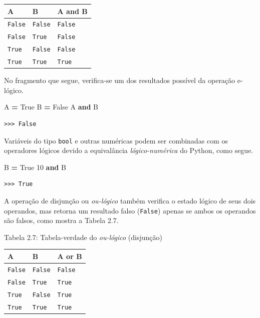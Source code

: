 \documentclass[
]{book}
\newenvironment{Shaded}{\begin{snugshade}}{\end{snugshade}}
\newcommand{\DecValTok}[1]{\textcolor[rgb]{0.00,0.00,0.81}{#1}}
\newcommand{\KeywordTok}[1]{\textcolor[rgb]{0.13,0.29,0.53}{\textbf{#1}}}
\newcommand{\NormalTok}[1]{#1}
\newcommand{\OperatorTok}[1]{\textcolor[rgb]{0.81,0.36,0.00}{\textbf{#1}}}
\newcommand{\VariableTok}[1]{\textcolor[rgb]{0.00,0.00,0.00}{#1}}
\begin{document}
\begin{longtable}[]{@{}lll@{}}
\toprule
A & B & A and B \\
\midrule
\endhead
\texttt{False} & \texttt{False} & \texttt{False} \\
\texttt{False} & \texttt{True} & \texttt{False} \\
\texttt{True} & \texttt{False} & \texttt{False} \\
\texttt{True} & \texttt{True} & \texttt{True} \\
\bottomrule
\end{longtable}

No fragmento que segue, verifica-se um dos resultados possível da operação e-lógico.

\begin{Shaded}
\begin{Highlighting}[]
\NormalTok{A }\OperatorTok{=} \VariableTok{True}
\NormalTok{B }\OperatorTok{=} \VariableTok{False}
\NormalTok{A }\KeywordTok{and}\NormalTok{ B}
\end{Highlighting}
\end{Shaded}

\begin{verbatim}
>>> False
\end{verbatim}

Variáveis do tipo \texttt{bool} e outras numéricas podem ser combinadas com os operadores lógicos devido a equivalância \emph{lógico-numérica} do Python, como segue.

\begin{Shaded}
\begin{Highlighting}[]
\NormalTok{B }\OperatorTok{=} \VariableTok{True}
\DecValTok{10} \KeywordTok{and}\NormalTok{ B}
\end{Highlighting}
\end{Shaded}

\begin{verbatim}
>>> True
\end{verbatim}

A operação de disjunção ou \emph{ou-lógico} também verifica o estado lógico de seus dois operandos, mas retorna um resultado falso (\texttt{False}) apenas se ambos os operandos são falsos, como mostra a Tabela 2.7.

Tabela 2.7: Tabela-verdade do \emph{ou-lógico} (disjunção)

\begin{longtable}[]{@{}lll@{}}
\toprule
A & B & A or B \\
\midrule
\endhead
\texttt{False} & \texttt{False} & \texttt{False} \\
\texttt{False} & \texttt{True} & \texttt{True} \\
\texttt{True} & \texttt{False} & \texttt{True} \\
\texttt{True} & \texttt{True} & \texttt{True} \\
\bottomrule
\end{longtable}
\end{document}
